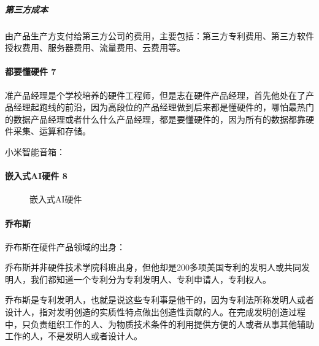\documentclass[letterpaper,10pt,english]{sphinxmanual}
\begin{document}
\subparagraph{第三方成本}
\label{\detokenize{chapter_project/AI_hardware:id26}}
由产品生产方支付给第三方公司的费用，主要包括：第三方专利费用、第三方软件授权费用、服务器费用、流量费用、云费用等。


\paragraph{都要懂硬件 7\sphinxfootnotemark[791]}
\label{\detokenize{chapter_project/AI_hardware:id27}}%
\begin{footnotetext}[791]\sphinxAtStartFootnote
{}
%
\end{footnotetext}\ignorespaces 
准产品经理是个学校培养的硬件工程师，但是志在硬件产品经理，首先他处在了产品经理起跑线的前沿，因为高段位的产品经理做到后来都是懂硬件的，哪怕最热门的数据产品经理或者什么什么产品经理，都是要懂硬件的，因为所有的数据都靠硬件采集、运算和存储。

小米智能音箱：


\paragraph{嵌入式AI硬件 8\sphinxfootnotemark[792]}
\label{\detokenize{chapter_project/AI_hardware:ai-8}}%
\begin{footnotetext}[792]\sphinxAtStartFootnote
{}
%
\end{footnotetext}\ignorespaces 
\begin{figure}[H]
\centering
\capstart

\noindent{}
\caption{嵌入式AI硬件}\label{\detokenize{chapter_project/AI_hardware:id39}}\end{figure}


\paragraph{乔布斯}
\label{\detokenize{chapter_project/AI_hardware:id28}}
乔布斯在硬件产品领域的出身：

乔布斯并非硬件技术学院科班出身，但他却是200多项美国专利的发明人或共同发明人，我们都知道一个专利分为专利发明人、专利申请人，专利权人。

乔布斯是专利发明人，也就是说这些专利事是他干的，因为专利法所称发明人或者设计人，指对发明创造的实质性特点做出创造性贡献的人。在完成发明创造过程中，只负责组织工作的人、为物质技术条件的利用提供方便的人或者从事其他辅助工作的人，不是发明人或者设计人。
\end{document}
